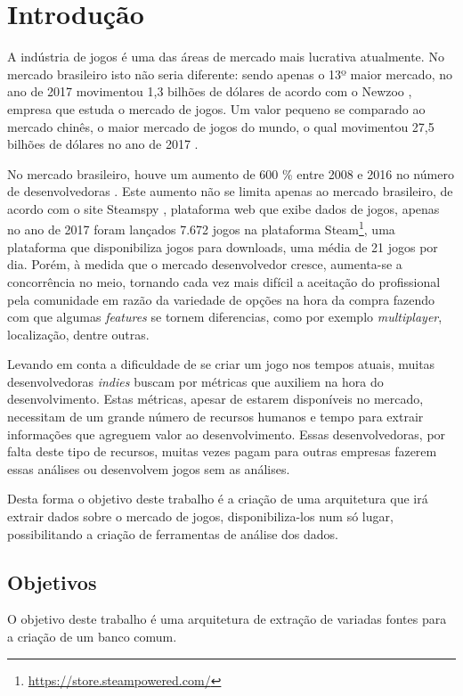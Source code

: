 \chapter[Introdução]{Introdução}
A indústria de jogos é uma das áreas de mercado mais lucrativa atualmente. No mercado brasileiro isto não seria diferente: sendo apenas o 13º maior mercado, no ano de 2017 movimentou 1,3 bilhões de dólares de acordo com o Newzoo \cite{newzoo_brasil}, empresa que estuda o mercado de jogos. Um valor pequeno se comparado ao mercado chinês, o maior mercado de jogos do mundo, o qual movimentou 27,5 bilhões de dólares no ano de 2017 \cite{newzoo_china}.

No mercado brasileiro, houve um aumento de 600 \% entre 2008 e 2016 no número de desenvolvedoras \cite{desenvolvedoras_crescimento}. Este aumento não se limita apenas ao mercado brasileiro, de acordo com o site Steamspy \cite{steam_spy}, plataforma web que exibe dados de jogos, apenas no ano de 2017 foram lançados 7.672 jogos na plataforma Steam\footnote[1]{\url{https://store.steampowered.com/}}, uma plataforma que disponibiliza jogos para downloads, uma média de 21 jogos por dia. Porém, à medida que o mercado desenvolvedor cresce, aumenta-se a concorrência no meio, tornando cada vez mais difícil a aceitação do profissional pela comunidade em razão da variedade de opções  na hora da compra fazendo com que algumas \textit{features} se tornem diferencias, como por exemplo \textit{multiplayer}, localização, dentre outras.

Levando em conta a dificuldade de se criar um jogo nos tempos atuais, muitas desenvolvedoras \textit{indies} buscam por métricas que auxiliem na hora do desenvolvimento. Estas métricas, apesar de estarem disponíveis no mercado, necessitam de um grande número de recursos humanos e tempo para extrair informações que agreguem valor ao desenvolvimento. Essas desenvolvedoras, por falta deste tipo de recursos, muitas vezes pagam para outras empresas fazerem essas análises ou desenvolvem jogos sem as análises.

Desta forma o objetivo deste trabalho é a criação de uma arquitetura que irá extrair dados sobre o mercado de jogos, disponibiliza-los num só lugar, possibilitando a criação de ferramentas de análise dos dados.

\section{Objetivos}
	O objetivo deste trabalho é uma arquitetura de extração de variadas fontes para a criação de um banco comum.
	

